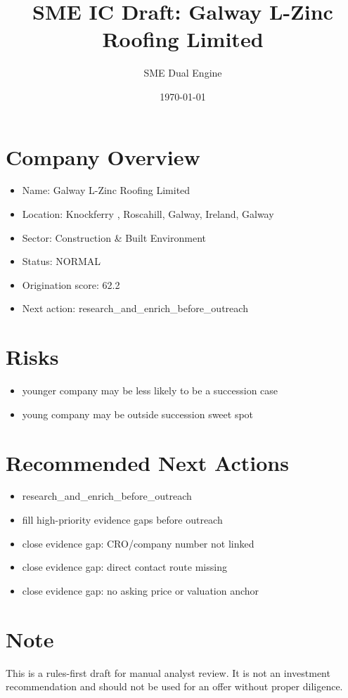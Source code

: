 \documentclass[11pt,a4paper]{article}
\title{SME IC Draft: Galway L-Zinc Roofing Limited}
\author{SME Dual Engine}
\date{\today}
\begin{document}
\maketitle
\section*{Company Overview}
\begin{itemize}[leftmargin=1.4em]
\item Name: Galway L-Zinc Roofing Limited
\item Location: Knockferry , Roscahill, Galway, Ireland, Galway
\item Sector: Construction \& Built Environment
\item Status: NORMAL
\item Origination score: 62.2
\item Next action: research\_and\_enrich\_before\_outreach
\end{itemize}
\section*{Risks}
\begin{itemize}[leftmargin=1.4em]
\item younger company may be less likely to be a succession case
\item young company may be outside succession sweet spot
\end{itemize}
\section*{Recommended Next Actions}
\begin{itemize}[leftmargin=1.4em]
\item research\_and\_enrich\_before\_outreach
\item fill high-priority evidence gaps before outreach
\item close evidence gap: CRO/company number not linked
\item close evidence gap: direct contact route missing
\item close evidence gap: no asking price or valuation anchor
\end{itemize}
\section*{Note}
This is a rules-first draft for manual analyst review. It is not an investment
recommendation and should not be used for an offer without proper diligence.
\end{document}
